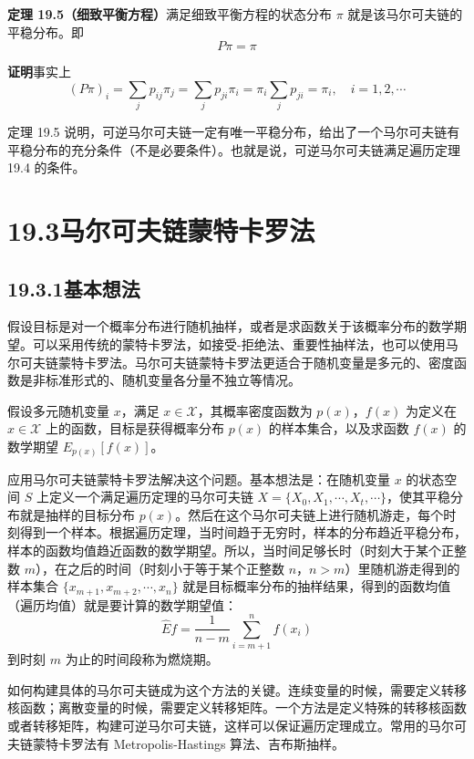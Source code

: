 \documentclass[UTF8,12pt,a4paper,fontset=fandol]{ctexart}
\begin{document}
\noindent\textbf{定理 19.5（细致平衡方程）}\quad 满足细致平衡方程的状态分布 $\pi$ 就是该马尔可夫链的平稳分布。即
\[
P\pi=\pi
\]

\noindent\textbf{证明}\quad 事实上
\begin{equation}
(P\pi)_i=\sum_j p_{ij}\pi_j=\sum_j p_{ji}\pi_i=\pi_i\sum_j p_{ji}=\pi_i,\quad i=1,2,\cdots
\tag{19.31}
\end{equation}

定理 19.5 说明，可逆马尔可夫链一定有唯一平稳分布，给出了一个马尔可夫链有平稳分布的充分条件（不是必要条件）。也就是说，可逆马尔可夫链满足遍历定理 19.4 的条件。

\section*{19.3\quad 马尔可夫链蒙特卡罗法}

\subsection*{19.3.1\quad 基本想法}

假设目标是对一个概率分布进行随机抽样，或者是求函数关于该概率分布的数学期望。可以采用传统的蒙特卡罗法，如接受-拒绝法、重要性抽样法，也可以使用马尔可夫链蒙特卡罗法。马尔可夫链蒙特卡罗法更适合于随机变量是多元的、密度函数是非标准形式的、随机变量各分量不独立等情况。

假设多元随机变量 $x$，满足 $x\in\mathcal{X}$，其概率密度函数为 $p(x)$，$f(x)$ 为定义在 $x\in\mathcal{X}$ 上的函数，目标是获得概率分布 $p(x)$ 的样本集合，以及求函数 $f(x)$ 的数学期望 $E_{p(x)}[f(x)]$。

应用马尔可夫链蒙特卡罗法解决这个问题。基本想法是：在随机变量 $x$ 的状态空间 $S$ 上定义一个满足遍历定理的马尔可夫链 $X=\{X_0,X_1,\cdots,X_t,\cdots\}$，使其平稳分布就是抽样的目标分布 $p(x)$。然后在这个马尔可夫链上进行随机游走，每个时刻得到一个样本。根据遍历定理，当时间趋于无穷时，样本的分布趋近平稳分布，样本的函数均值趋近函数的数学期望。所以，当时间足够长时（时刻大于某个正整数 $m$），在之后的时间（时刻小于等于某个正整数 $n$，$n>m$）里随机游走得到的样本集合 $\{x_{m+1},x_{m+2},\cdots,x_n\}$ 就是目标概率分布的抽样结果，得到的函数均值（遍历均值）就是要计算的数学期望值：
\begin{equation}
\hat E f=\frac{1}{n-m}\sum_{i=m+1}^{n}f(x_i)
\tag{19.32}
\end{equation}
到时刻 $m$ 为止的时间段称为燃烧期。

如何构建具体的马尔可夫链成为这个方法的关键。连续变量的时候，需要定义转移核函数；离散变量的时候，需要定义转移矩阵。一个方法是定义特殊的转移核函数或者转移矩阵，构建可逆马尔可夫链，这样可以保证遍历定理成立。常用的马尔可夫链蒙特卡罗法有 Metropolis-Hastings 算法、吉布斯抽样。
\end{document}
